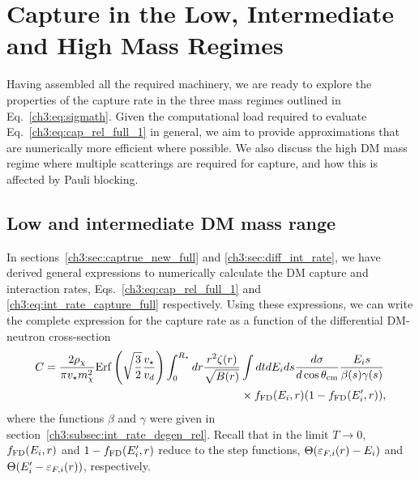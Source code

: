 \section{Capture in the Low, Intermediate and High Mass Regimes}
\label{ch3:sec:capture_analysis}

Having assembled all the required machinery, we are ready to explore the properties of the capture rate in the three mass regimes outlined in Eq.~\ref{ch3:eq:sigmath}.  Given the computational load required to evaluate Eq.~\ref{ch3:eq:cap_rel_full_1} in general, we aim to provide approximations that are numerically more efficient where possible. We also discuss the high DM mass regime where multiple scatterings are required for capture, and how this is affected by Pauli blocking. 


\subsection{Low and intermediate DM mass range}
\label{ch3:sec:captureintermediate}


In sections~\ref{ch3:sec:captrue_new_full} and \ref{ch3:sec:diff_int_rate}, we have derived general expressions to numerically calculate the DM capture and interaction rates,  
Eqs.~\ref{ch3:eq:cap_rel_full_1} and \ref{ch3:eq:int_rate_capture_full} respectively.   
Using these expressions, we can write 
the complete expression for the capture rate as a function of the differential DM-neutron cross-section 
\begin{equation}
    \begin{split}
        C = \frac{2\rho_\chi}{\pi v_\star m_\chi^2} {\rm Erf}\left(\sqrt{\frac{3}{2}}\frac{v_\star}{v_d}\right)\int_0^{R_\star}  dr  \frac{r^2\zeta(r)}{\sqrt{B(r)}} &\int dt dE_i ds \frac{d\sigma}{d\cos\theta_\mathrm{cm}}\frac{E_i s}{\beta(s)\gamma(s)}\\
        &\times f_{\rm FD}(E_i,r)(1-f_{\rm FD}(E_i',r)), 
    \end{split}
\label{ch3:eq:capturefinal}
\end{equation}
where the functions $\beta$ and $\gamma$ were given in section~\ref{ch3:subsec:int_rate_degen_rel}. Recall that in the limit $T\rightarrow0$,  $f_{\rm FD}(E_i,r)$ and $1-f_{\rm FD}(E_i',r)$  reduce to the step functions,  $\Theta(\varepsilon_{F,i}(r)-E_i)$ and  $\Theta(E_i'-\varepsilon_{F,i}(r))$, respectively. 


